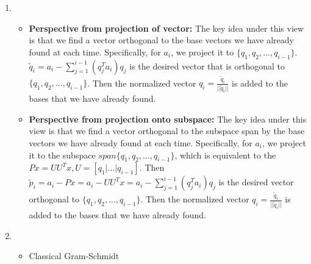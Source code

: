\documentclass[english,onecolumn]{IEEEtran}
\begin{document}
\begin{enumerate}
    \item 
    \begin{itemize}
    	\item {\bf Perspective from projection of vector:} The key idea under this view is that we find a vector orthogonal to the base vectors we have already found at each time. Specifically, for $a_i$, we project it to $\{q_1,q_2,...,q_{i-1}\}$. $\tilde{q}_i=a_i-\sum_{j=1}^{i-1}(q_j^Ta_i)q_j$ is the desired vector that is orthogonal to $\{q_1,q_2,...,q_{i-1}\}$. Then the normalized vector $q_{i}=\frac{\tilde{q}_i}{||\tilde{q}_i||}$ is added to the bases that we have already found.
    	\item {\bf Perspective from projection onto subspace:} The key idea under this view is that we find a vector orthogonal to the subspace span by the base vectors we have already found at each time. Specifically, for $a_i$, we project it to the subspace $span\{q_1,q_2,...,q_{i-1}\}$, which is equivalent to the $Px = UU^Tx, U=[q_1|...|q_{i-1}]$. Then $\tilde{p}_i=a_i-Px = a_i-UU^Tx=a_i-\sum_{j=1}^{i-1}(q_j^Ta_i)q_j$ is the desired vector orthogonal to $\{q_1,q_2,...,q_{i-1}\}$. Then the normalized vector $q_{i}=\frac{\tilde{q}_i}{||\tilde{q}_i||}$ is added to the bases that we have already found.
    \end{itemize}
   	\item 
   	\begin{itemize}
   		\item Classical Gram-Schmidt


\end{itemize}
\end{enumerate}
\end{document}
